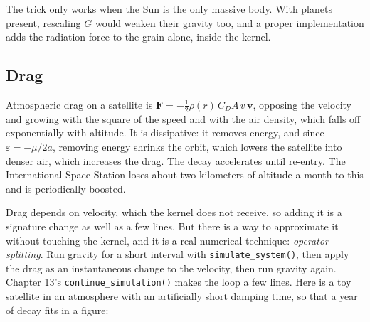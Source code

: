 \documentclass[
  10.5pt,
  letterpaper,
]{scrbook}
\theoremstyle{definition}
\theoremstyle{plain}
\theoremstyle{remark}
\begin{document}
The trick only works when the Sun is the only massive body. With planets
present, rescaling \(G\) would weaken their gravity too, and a proper
implementation adds the radiation force to the grain alone, inside the
kernel.

\subsection{Drag}\label{drag}

Atmospheric drag on a satellite is
\(\mathbf{F} = -\tfrac12 \rho(r)\, C_D A\, v\,\mathbf{v}\), opposing the
velocity and growing with the square of the speed and with the air
density, which falls off exponentially with altitude. It is dissipative:
it removes energy, and since \(\varepsilon = -\mu/2a\), removing energy
shrinks the orbit, which lowers the satellite into denser air, which
increases the drag. The decay accelerates until re-entry. The
International Space Station loses about two kilometers of altitude a
month to this and is periodically boosted.

Drag depends on velocity, which the kernel does not receive, so adding
it is a signature change as well as a few lines. But there is a way to
approximate it without touching the kernel, and it is a real numerical
technique: \emph{operator splitting}. Run gravity for a short interval
with \texttt{simulate\_system()}, then apply the drag as an
instantaneous change to the velocity, then run gravity again. Chapter
13's \texttt{continue\_simulation()} makes the loop a few lines. Here is
a toy satellite in an atmosphere with an artificially short damping
time, so that a year of decay fits in a figure:
\end{document}

